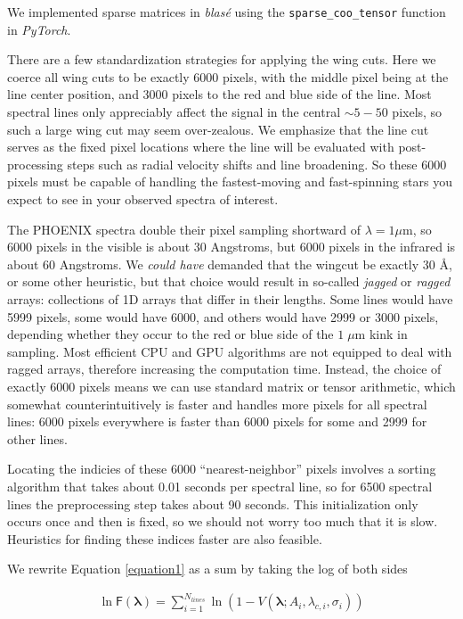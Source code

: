 \documentclass[modern]{aastex631}
\begin{document}
We implemented sparse matrices in \emph{blas\'e} using the \texttt{sparse\_coo\_tensor} function in \emph{PyTorch}.

There are a few standardization strategies for applying the wing cuts.  Here we coerce all wing cuts to be exactly 6000 pixels, with the middle pixel being at the line center position, and 3000 pixels to the red and blue side of the line.  Most spectral lines only appreciably affect the signal in the central $\sim5-50$ pixels, so such a large wing cut may seem over-zealous.  We emphasize that the line cut serves as the fixed pixel locations where the line will be evaluated with post-processing steps such as radial velocity shifts and line broadening.  So these 6000 pixels must be capable of handling the fastest-moving and fast-spinning stars you expect to see in your observed spectra of interest.

The PHOENIX spectra double their pixel sampling shortward of $\lambda = 1 \mu$m, so 6000 pixels in the visible is about 30 Angstroms, but 6000 pixels in the infrared is about 60 Angstroms.  We \emph{could have} demanded that the wingcut be exactly 30 Å, or some other heuristic, but that choice would result in so-called \emph{jagged} or \emph{ragged} arrays: collections of 1D arrays that differ in their lengths.  Some lines would have 5999 pixels, some would have 6000, and others would have 2999 or 3000 pixels, depending whether they occur to the red or blue side of the $1 \;\mu$m kink in sampling.  Most efficient CPU and GPU algorithms are not equipped to deal with ragged arrays, therefore increasing the computation time.  Instead, the choice of exactly 6000 pixels means we can use standard matrix or tensor arithmetic, which somewhat counterintuitively is faster and handles more pixels for all spectral lines: 6000 pixels everywhere is faster than 6000 pixels for some and 2999 for other lines.

Locating the indicies of these 6000 ``nearest-neighbor'' pixels involves a sorting algorithm that takes about 0.01 seconds per spectral line, so for 6500 spectral lines the preprocessing step takes about 90 seconds.  This initialization only occurs once and then is fixed, so we should not worry too much that it is slow.  Heuristics for finding these indices faster are also feasible.

We rewrite Equation \ref{equation1} as a sum by taking the log of both sides

\begin{eqnarray}
  \ln{\mathsf{F}(\bm{\lambda})} = \sum_{i=1}^{N_{lines}} \ln{\left(1-V(\bm{\lambda};A_i, \lambda_{c,i}, \sigma_i) \right)}
\end{eqnarray}
\end{document}
